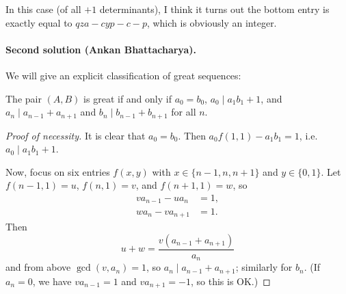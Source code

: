 \documentclass[11pt]{scrartcl}
\begin{document}
\begin{remark*}
  In this case (of all $+1$ determinants),
  I think it turns out the bottom entry is
  exactly equal to $qza - cyp - c - p$,
  which is obviously an integer.
\end{remark*}


\paragraph{Second solution (Ankan Bhattacharya).}
We will give an explicit classification of great sequences:
\begin{lemma*}
  The pair $(A,B)$ is great if and only if
  $a_0 = b_0$, $a_0 \mid a_1b_1 + 1$, and
  $a_n \mid a_{n-1} + a_{n+1}$ and $b_n \mid b_{n-1} + b_{n+1}$ for all $n$.
\end{lemma*}
\begin{proof}[Proof of necessity]
  It is clear that $a_0 = b_0$.
  Then $a_0f(1, 1) - a_1b_1 = 1$,
  i.e. $a_0 \mid a_1b_1 + 1$.

  Now, focus on six entries $f(x, y)$
  with $x \in \{n-1, n, n+1\}$ and $y \in \{0, 1\}$.
  Let $f(n-1, 1) = u$, $f(n, 1) = v$, and $f(n+1, 1) = w$, so
  \begin{align*}
    v a_{n-1} - u a_n & = 1,\\
    w a_n - v a_{n+1} & = 1.
  \end{align*}
  Then
  \[u + w = \frac{v(a_{n-1} + a_{n+1})}{a_n}\]
  and from above $\gcd(v, a_n) = 1$,
  so $a_n \mid a_{n-1} + a_{n+1}$;
  similarly for $b_n$.
  (If $a_n = 0$,
  we have $va_{n-1} = 1$ and $va_{n+1} = -1$,
  so this is OK.)
\end{proof}
\end{document}

